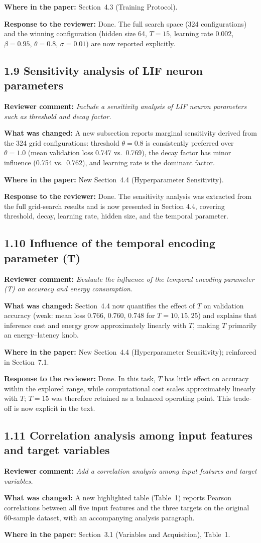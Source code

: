 \documentclass[11pt,a4paper]{article}
\newcommand{\comment}[1]{\textbf{Reviewer comment:} \textit{#1}}
\newcommand{\change}[1]{\textbf{What was changed:} #1}
\newcommand{\where}[1]{\textbf{Where in the paper:} #1}
\newcommand{\resp}[1]{\textbf{Response to the reviewer:} \textcolor{revblue}{#1}}
\newcommand{\pt}[1]{\subsection*{#1}}
\begin{document}
\where{Section~4.3 (Training Protocol).}

\resp{Done. The full search space (324 configurations) and the winning configuration (hidden size 64, $T=15$, learning rate 0.002, $\beta=0.95$, $\theta=0.8$, $\sigma=0.01$) are now reported explicitly.}

\pt{1.9 Sensitivity analysis of LIF neuron parameters}
\comment{Include a sensitivity analysis of LIF neuron parameters such as threshold and decay factor.}

\change{A new subsection reports marginal sensitivity derived from the 324 grid configurations: threshold $\theta=0.8$ is consistently preferred over $\theta=1.0$ (mean validation loss 0.747 vs.\ 0.769), the decay factor has minor influence (0.754 vs.\ 0.762), and learning rate is the dominant factor.}

\where{New Section~4.4 (Hyperparameter Sensitivity).}

\resp{Done. The sensitivity analysis was extracted from the full grid-search results and is now presented in Section 4.4, covering threshold, decay, learning rate, hidden size, and the temporal parameter.}

\pt{1.10 Influence of the temporal encoding parameter (T)}
\comment{Evaluate the influence of the temporal encoding parameter (T) on accuracy and energy consumption.}

\change{Section~4.4 now quantifies the effect of $T$ on validation accuracy (weak: mean loss 0.766, 0.760, 0.748 for $T=10,15,25$) and explains that inference cost and energy grow approximately linearly with $T$, making $T$ primarily an energy--latency knob.}

\where{New Section~4.4 (Hyperparameter Sensitivity); reinforced in Section~7.1.}

\resp{Done. In this task, $T$ has little effect on accuracy within the explored range, while computational cost scales approximately linearly with $T$; $T=15$ was therefore retained as a balanced operating point. This trade-off is now explicit in the text.}

\pt{1.11 Correlation analysis among input features and target variables}
\comment{Add a correlation analysis among input features and target variables.}

\change{A new highlighted table (Table~1) reports Pearson correlations between all five input features and the three targets on the original 60-sample dataset, with an accompanying analysis paragraph.}

\where{Section~3.1 (Variables and Acquisition), Table~1.}
\end{document}
